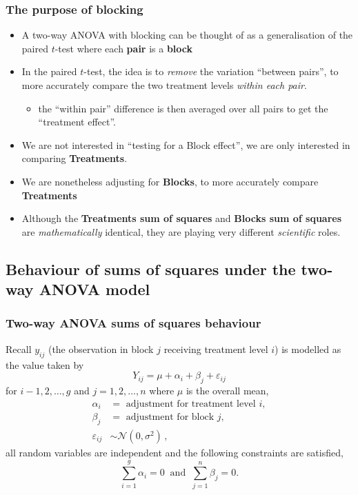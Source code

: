 \documentclass[a4paper]{article}\usepackage[]{graphicx}\usepackage[]{xcolor}
\begin{document}
\subsubsection{The purpose of blocking}
\begin{itemize}
	\item A two-way ANOVA with blocking can be thought of as a generalisation of the paired \( t \)-test where each \textbf{pair} is a \textbf{block}
	\item In the paired \( t \)-test, the idea is to \textit{remove} the variation ``between pairs'', to more accurately compare the two treatment levels \textit{within each pair}.
	\begin{itemize}
		\item the ``within pair'' difference is then averaged over all pairs to get the ``treatment effect''.
	\end{itemize}
	\item We are not interested in ``testing for a Block effect'', we are only interested in comparing \textcolor{mygreen}{\textbf{Treatments}}.
	\item We are nonetheless adjusting for \textcolor{myred}{\textbf{Blocks}}, to more accurately compare \textcolor{mygreen}{\textbf{Treatments}}
	\item Although the \textcolor{mygreen}{\textbf{Treatments sum of squares}} and \textcolor{myred}{\textbf{Blocks sum of squares}} are \textit{mathematically} identical, they are playing very different \textit{scientific} roles.
\end{itemize}
\subsection{Behaviour of sums of squares under the two-way ANOVA model}
\subsubsection{Two-way ANOVA sums of squares behaviour}
Recall \( y_{ij} \) (the observation in block \( j \) receiving treatment level \( i \)) is modelled as the value taken by
\[
	Y_{ij} = \mu + \alpha_i + \beta_j + \varepsilon_{ij}
\]
for \( i-1,2,\dotsc,g \) and \( j = 1,2,\dotsc,n \) where \( \mu \) is the overall mean,
\begin{align*}
	\alpha_i & = \text{ adjustment for treatment level } i,\\
	\beta_{j} & = \text{ adjustment for block }j, \\
	\varepsilon_{ij} & \sim {\mathcal N}(0,\sigma^2)\,,
\end{align*}
all random variables are independent and the following constraints are satisfied,
\[
	\sum_{i=1}^g\alpha_i = 0\ \text{ and } \ \sum_{j=1}^n\beta_j=0.
\]
\end{document}
